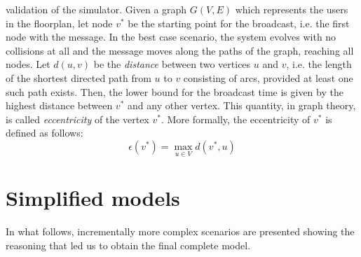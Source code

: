 validation of the simulator. Given a graph $G(V, E)$ which represents the users
in the floorplan, let node $v^{*}$ be the starting point for the broadcast, i.e.
the first node with the message. In the best case scenario, the system evolves
with no collisions at all and the message moves along the paths of the graph,
reaching all nodes. Let $d(u, v)$ be the \textit{distance} between two vertices
$u$ and $v$, i.e. the length of the shortest directed path from $u$ to $v$
consisting of arcs, provided at least one such path exists. Then, the lower
bound for the broadcast time is given by the highest distance between $v^{*}$
and any other vertex. This quantity, in graph theory, is called
\textit{eccentricity} of the vertex $v^{*}$. More formally, the eccentricity of
$v^{*}$ is defined as follows:
\begin{equation}
\epsilon(v^{*}) = \max_{u{\in}V} d(v^{*}, u)
\end{equation}
\section{Simplified models}
In what follows, incrementally more complex scenarios are presented showing the
reasoning that led us to obtain the final complete model.
